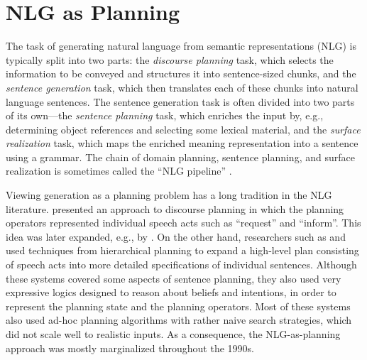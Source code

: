 \section{NLG as Planning} \label{sec:nlg-as-planning}

The task of generating natural language from semantic representations (NLG) is
typically split into two parts: the \emph{discourse planning} task, which
selects the information to be conveyed and structures it into sentence-sized
chunks, and the \emph{sentence generation} task, which then translates each of
these chunks into natural language sentences. The sentence generation task is
often divided into two parts of its own---the \emph{sentence planning} task,
which enriches the input by, e.g., determining object references and selecting
some lexical material, and the \emph{surface realization} task, which maps the
enriched meaning representation into a sentence using a grammar. The chain of
domain planning, sentence planning, and surface realization is sometimes called
the ``NLG pipeline'' \citep{reiter00building}.

Viewing generation as a planning problem has a long tradition in the NLG
literature. \citet{perrault80} presented an approach to discourse planning
in which the planning operators represented individual speech acts such as
``request'' and ``inform''. This idea was later expanded, e.g., by
\citet{young94dpocl}. On the other hand, researchers such as
\citet{appelt:planning} and \citet{hovy88} used techniques from
hierarchical planning to expand a high-level plan consisting of speech acts
into more detailed specifications of individual sentences. Although these
systems covered some aspects of sentence planning, they also used very
expressive logics designed to reason about beliefs and intentions, in order
to represent the planning state and the planning operators. Most of these
systems also used ad-hoc planning algorithms with rather naive search
strategies, which did not scale well to realistic inputs. As a consequence,
the NLG-as-planning approach was mostly marginalized throughout the 1990s.

